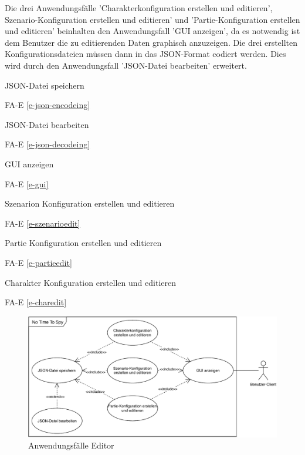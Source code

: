 Die drei Anwendungsfälle 'Charakterkonfiguration erstellen und editieren', Szenario-Konfiguration erstellen und editieren' und 'Partie-Konfiguration erstellen und editieren' beinhalten den Anwendungsfall 'GUI anzeigen', da es notwendig ist dem Benutzer die zu editierenden Daten graphisch anzuzeigen. Die drei erstellten Konfigurationsdateien müssen dann in das JSON-Format codiert werden. Dies wird durch den Anwendungsfall 'JSON-Datei bearbeiten' erweitert.

JSON-Datei speichern

FA-E \ref{e-json-encodeing} %

JSON-Datei bearbeiten

FA-E \ref{e-json-decodeing} %

GUI anzeigen

FA-E \ref{e-gui} %

Szenarion Konfiguration erstellen und editieren

FA-E \ref{e-szenarioedit} %

Partie Konfiguration erstellen und editieren

FA-E \ref{e-partieedit} %

Charakter Konfiguration erstellen und editieren

FA-E \ref{e-charedit} %

\begin{figure}
  \centering
  \includegraphics[width=\textwidth]{Meilenstein02/use_case_editor.pdf}
  \caption{Anwendungsfälle Editor}
\end{figure}
